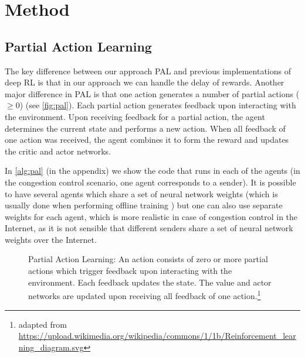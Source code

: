 \documentclass[10pt,sigconf,anonymous]{acmart}
\begin{document}
\section{Method}
\subsection{Partial Action Learning}
\label{subsec:pal}

The key difference between our approach PAL and previous implementations of deep RL is that in our approach we can handle the delay of rewards. Another major difference in PAL is that one action generates a number of partial actions ($\geq 0$) (see \autoref{fig:pal}). Each partial action generates feedback upon interacting with the environment. Upon receiving feedback for a partial action, the agent determines the current state and performs a new action. When all feedback of one action was received, the agent combines it to form the reward and updates the critic and actor networks.

In \autoref{alg:pal} (in the appendix) we show the code that runs in each of the agents (in the congestion control scenario, one agent corresponds to a sender). It is possible to have several agents which share a set of neural network weights (which is usually done when performing offline training \cite{mnih_asynchronous_2016,mao_neural_2017}) but one can also use separate weights for each agent, which is more realistic in case of congestion control in the Internet, as it is not sensible that different senders share a set of neural network weights over the Internet.

%

\begin{figure}
\begin{minipage}{\columnwidth}
%

\caption{Partial Action Learning: An action consists of zero or more partial actions which trigger feedback upon interacting with the environment. Each feedback updates the state. The value and actor networks are updated upon receiving all feedback of one action.\protect\footnote{adapted from \url{https://upload.wikimedia.org/wikipedia/commons/1/1b/Reinforcement_learning_diagram.svg}}}
\label{fig:pal}
\end{minipage}
\end{figure}
\end{document}
